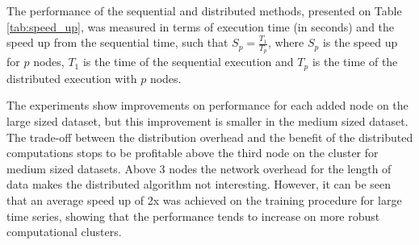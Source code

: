 The performance of the sequential and distributed methods, presented on Table \ref{tab:speed_up}, was measured in terms of execution time (in seconds) and the speed up from the sequential time, such that $S_p = \frac{T_1}{T_p}$, where $S_p$ is the speed up for $p$ nodes, $T_1$ is the time of the sequential execution and $T_p$ is the time of the distributed execution with $p$ nodes. 

The experiments show improvements on performance for each added node on the large sized dataset, but this improvement is smaller in the medium sized dataset.  The trade-off between the distribution overhead and the benefit of the distributed computations stops to be profitable above the third node on the cluster for medium sized datasets. Above 3 nodes the network overhead for the length of data makes the distributed algorithm not interesting. However, it can be seen that an average speed up of 2x was achieved on the training procedure for large time series, showing that the performance tends to increase on more robust computational clusters.  


